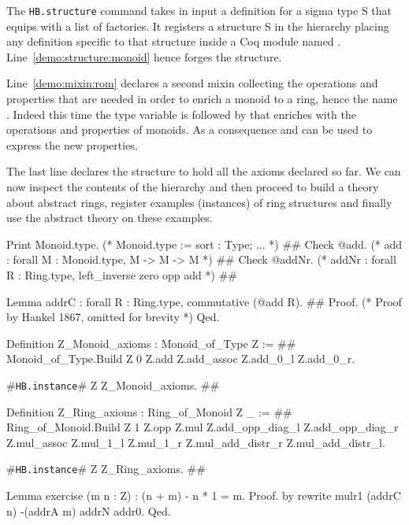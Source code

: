 \documentclass[a4paper,UKenglish,cleveref, autoref]{lipics-v2019}
\newcommand{\mixin}{mixin}
\newcommand{\factories}{factories}
\newcommand{\hbinstance}{{\tt\color{dkgreen}HB.instance}}
\newcommand{\hbstructure}{{\tt\color{dkgreen}HB.structure}}
\theoremstyle{implem}
\theoremstyle{implem}
\theoremstyle{command}
\begin{document}
The \hbstructure{} command takes in input a definition for a sigma type S
that equips  with a list of \factories{}.
It registers a structure S in the hierarchy placing
any definition specific to that structure inside a Coq module named .
Line~\ref{demo:structure:monoid} hence forges the  structure.

Line~\ref{demo:mixin:rom} declares a second \mixin{} collecting the operations
and properties that are needed in order to enrich a monoid to a ring, hence
the name . Indeed this time the type variable 
is followed by  that enriches
 with the operations and properties of monoids. As a consequence
 and  can be used to express the new properties.

The last line declares the  structure to hold all the axioms declared
so far. We can now inspect the contents of the hierarchy and then
proceed to build a theory about abstract rings,
register examples (instances) of ring structures
and finally use the abstract theory on these examples.

\begin{coqcode}
Print Monoid.type. (* Monoid.type  :=  { sort : Type;  ... }                           *) #\label{demo:theory:print:type}#
Check @add.        (* add          :   forall M : Monoid.type, M -> M -> M             *) #\label{demo:theory:check:add}#
Check @addNr.      (* addNr        :   forall R : Ring.type, left_inverse zero opp add *) #\label{demo:theory:check:addNr}#

Lemma addrC : forall R : Ring.type, commutative (@add R).                       #\label{demo:theory:state:addrC}#
Proof. (* Proof by Hankel 1867, omitted for brevity *) Qed.

Definition Z_Monoid_axioms : Monoid_of_Type Z :=                         #\label{demo:theory:z:monoid:axioms}#
  Monoid_of_Type.Build Z 0 Z.add Z.add_assoc Z.add_0_l Z.add_0_r.

#\hbinstance{}# Z Z_Monoid_axioms.                                            #\label{demo:theory:z:monoid:canonical}#

Definition Z_Ring_axioms : Ring_of_Monoid Z _ :=                        #\label{demo:theory:z:ring:axioms}#
  Ring_of_Monoid.Build Z 1 Z.opp Z.mul
    Z.add_opp_diag_l Z.add_opp_diag_r Z.mul_assoc Z.mul_1_l Z.mul_1_r
    Z.mul_add_distr_r Z.mul_add_distr_l.

#\hbinstance{}# Z Z_Ring_axioms.                                              #\label{demo:theory:z:ring:canonical}#

Lemma exercise (m n : Z) : (n + m) - n * 1 = m.
Proof. by rewrite mulr1 (addrC n) -(addrA m) addrN addr0. Qed.
\end{coqcode}
\end{document}
